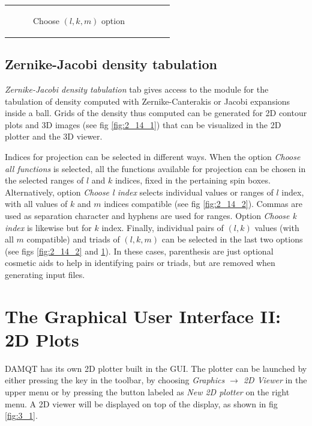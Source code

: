 \documentclass[10pt]{article}
\begin{document}
\begin{tabular}{lcr}
\begin{minipage}{.3\linewidth}
\begin{figure}[H]
\begin{center}
\end{center}
\caption{{Choose $(l,k,m)$ option}\label{fig:2_14_4}}
\end{figure}
\end{minipage}
\end{tabular}

\subsection{Zernike-Jacobi density tabulation\label{sec:2.14}}

{\it Zernike-Jacobi density tabulation} tab gives access to the module for the tabulation of density
computed with Zernike-Canterakis or Jacobi expansions inside a ball.
Grids of the density thus computed can be generated for 2D contour plots and 3D images (see fig
\ref{fig:2_14_1}) that can be visualized in the 2D plotter and the 3D viewer. 

Indices for projection can be selected in different ways. When the option {\it Choose all functions} is selected,
all the functions available for projection can be chosen in the selected ranges of $l$ and $k$ indices, fixed in
the pertaining spin boxes. Alternatively, option {\it Choose l index} selects individual values or
ranges of $l$ index, with all values of $k$ and $m$ indices compatible (see fig \ref{fig:2_14_2}). Commas are used as separation 
character 
and hyphens are used for ranges. Option {\it Choose k index} is likewise but for $k$ index.
Finally, individual pairs of $(l,k)$ values (with all $m$ compatible) and triads of $(l,k,m)$ can be selected 
in the last two options (see figs \ref{fig:2_14_2} and \ref{fig:2_14_4}). In these cases, parenthesis are just optional cosmetic
aids to help in identifying pairs or triads, but are removed when generating input files.

\newpage

\section{The Graphical User Interface II: 2D Plots \label{sec:3}}

DAMQT has its own 2D plotter built in the GUI. The plotter can be launched by either pressing the 
key \bigtoolbC in the toolbar, by choosing {\it Graphics $\rightarrow$ 2D Viewer} in the upper menu
or by pressing the button labeled as {\it New 2D plotter} on the right menu. 
A 2D viewer will be displayed on top of the display, as shown in fig \ref{fig:3_1}. 
   
\end{document}

